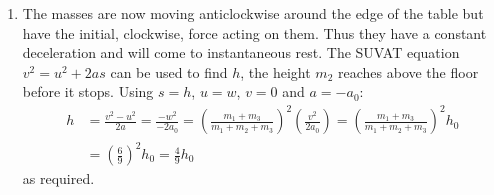 \begin{problem}[A1969AMIIQ2a]
{\begin{enumerate}
\begin{enumerate}
		\item The impulse on $m_{2}$ is simply the change in its momentum as it is lifted from the floor. It starts stationary on the floor and is then moving upwards at a speed $w$:
\begin{align*} 
I &= (m_{2})(w) - (m_{2})(0) = m_{2}w = \frac{m_{2} \left(m_{1} + m_{3} \right)}{m_{1} + m_{2} + m_{3}} v = \frac{m_{2} \sqrt{2a_{0}h_{0}} \left(m_{1} + m_{3} \right)}{m_{1} + m_{2} + m_{3}} \\ 
&= \frac{(3)(1.4)(6)}{9} \text{ kg ms}^{-1} = \frac{14}{5} \text{ kg ms}^{-1} = 2.8 \text{ kg ms}^{-1}
\end{align*}

The loss in kinetic energy (KE) as $m_{2}$ starts moving is given by the total KE before, minus the KE after:
\begin{align*} 
\text{KE Loss} &= \left( \frac{1}{2}m_{1}v^{2} + \frac{1}{2}m_{3}v^{2} \right) - \left( \frac{1}{2}m_{1}w^{2} + \frac{1}{2}m_{2}w^{2} + \frac{1}{2}m_{3}w^{2} \right) \\ 
&= \frac{1}{2} \left( (m_{1} + m_{3})v^{2} - (m_{1} + m_{2} + m_{3})w^{2} \right) \\ &= \frac{1}{2}v^{2} \left( (m_{1} + m_{3}) - \frac{(m_{1} + m_{3})^{2}}{m_{1} + m_{2} + m_{3}} \right) \\ 
&= \frac{1}{2}(1.4)^{2} \left( 6 - \frac{36}{9} \right) \text{ J} \\ 
&= \frac{49}{25} \text{ J} = 1.96 \text{ J}
\end{align*}
	\end{enumerate}
	\item The masses are now moving anticlockwise around the edge of the table but have the initial, clockwise, force acting on them. Thus they have a constant deceleration and will come to instantaneous rest. The SUVAT equation $v^{2} = u^{2} + 2as$ can be used to find $h$, the height $m_{2}$ reaches above the floor before it stops. Using $s = h$, $u = w$, $v = 0$ and $a = -a_{0}$:
\begin{align*}
 h &= \frac{v^{2} - u^{2}}{2a} = \frac{-w^{2}}{-2a_{0}} = \left( \frac{m_{1} + m_{3}}{m_{1} + m_{2} + m_{3}} \right)^{2} \left( \frac{v^{2}}{2a_{0}} \right) =  \left( \frac{m_{1} + m_{3}}{m_{1} + m_{2} + m_{3}} \right)^{2} h_{0} \\ 
 &= \left( \frac{6}{9} \right)^{2} h_{0} = \frac{4}{9} h_{0}
 \end{align*} 
 as required.
\end{enumerate}}
\end{problem}